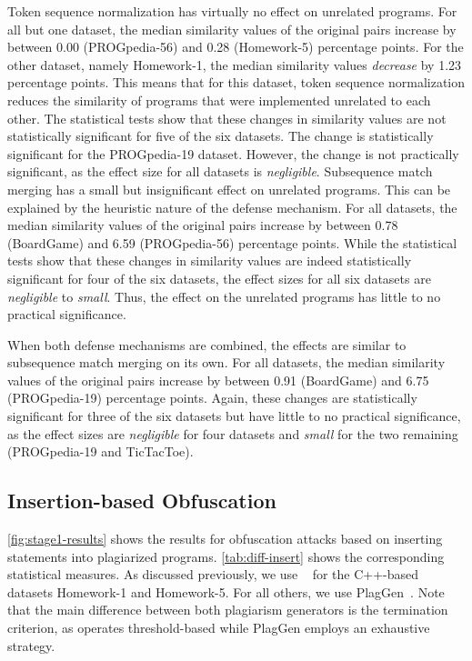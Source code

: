 Token sequence normalization has virtually no effect on unrelated programs.
For all but one dataset, the median similarity values of the original pairs increase by between 0.00 (PROGpedia-56) and 0.28 (Homework-5) percentage points.
For the other dataset, namely Homework-1, the median similarity values \textit{decrease} by 1.23 percentage points. This means that for this dataset, token sequence normalization reduces the similarity of programs that were implemented unrelated to each other.
The statistical tests show that these changes in similarity values are not statistically significant for five of the six datasets. The change is statistically significant for the PROGpedia-19 dataset. However, the change is not practically significant, as the effect size for all datasets is \textit{negligible}.
%
Subsequence match merging has a small but insignificant effect on unrelated programs. This can be explained by the heuristic nature of the defense mechanism.
For all datasets, the median similarity values of the original pairs increase by between 0.78 (BoardGame) and 6.59 (PROGpedia-56) percentage points.
While the statistical tests show that these changes in similarity values are indeed statistically significant for four of the six datasets, the effect sizes for all six datasets are \textit{negligible} to \textit{small}.
Thus, the effect on the unrelated programs has little to no practical significance. 

When both defense mechanisms are combined, the effects are similar to subsequence match merging on its own.
For all datasets, the median similarity values of the original pairs increase by between 0.91 (BoardGame) and 6.75 (PROGpedia-19) percentage points.
Again, these changes are statistically significant for three of the six datasets but have little to no practical significance, as the effect sizes are \textit{negligible} for four datasets and \textit{small} for the two remaining (PROGpedia-19 and TicTacToe).


\subsection{Insertion-based Obfuscation}\label{sec:eval-insert}
\autoref{fig:stage1-results} shows the results for obfuscation attacks based on inserting statements into plagiarized programs.
\autoref{tab:diff-insert} shows the corresponding statistical measures.
As discussed previously, we use \mossad~\cite{DevoreMcDonald2020} for the C++-based datasets Homework-1 and Homework-5. For all others, we use PlagGen~\cite{Broedel2023}. Note that the main difference between both plagiarism generators is the termination criterion, as \mossad operates threshold-based while PlagGen employs an exhaustive strategy.

